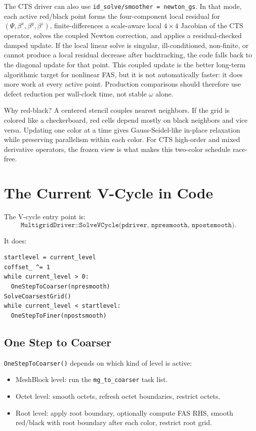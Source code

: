 \documentclass[11pt]{article}
\newcommand{\code}[1]{\texttt{#1}}
\begin{document}
The CTS driver can also use \code{id\_solve/smoother = newton\_gs}.  In that
mode, each active red/black point forms the four-component local residual for
\((\Psi,\beta^x,\beta^y,\beta^z)\), finite-differences a scale-aware local
\(4\times4\) Jacobian of the CTS operator, solves the coupled Newton correction,
and applies a residual-checked damped update.  If the local linear solve is
singular, ill-conditioned, non-finite, or cannot produce a local residual
decrease after backtracking, the code falls back to the diagonal update for that
point.
This coupled update is the better long-term algorithmic target for nonlinear
FAS, but it is not automatically faster: it does more work at every active
point.  Production comparisons should therefore use defect reduction per
wall-clock time, not stable \(\omega\) alone.

Why red-black?  A centered stencil couples nearest neighbors.  If the grid is
colored like a checkerboard, red cells depend mostly on black neighbors and vice
versa.  Updating one color at a time gives Gauss-Seidel-like in-place relaxation
while preserving parallelism within each color.  For CTS high-order and mixed
derivative operators, the frozen view is what makes this two-color schedule
race-free.

\section{The Current V-Cycle in Code}

The V-cycle entry point is:
\[
  \code{MultigridDriver::SolveVCycle(pdriver, npresmooth, npostsmooth)}.
\]

It does:
\begin{lstlisting}
startlevel = current_level
coffset_ ^= 1
while current_level > 0:
  OneStepToCoarser(npresmooth)
SolveCoarsestGrid()
while current_level < startlevel:
  OneStepToFiner(npostsmooth)
\end{lstlisting}

\subsection{One Step to Coarser}

\code{OneStepToCoarser()} depends on which kind of level is active:
\begin{itemize}
  \item MeshBlock level: run the \code{mg\_to\_coarser} task list.
  \item Octet level: smooth octets, refresh octet boundaries, restrict octets.
  \item Root level: apply root boundary, optionally compute FAS RHS, smooth
        red/black with root boundary after each color, restrict root grid.
\end{itemize}
\end{document}
